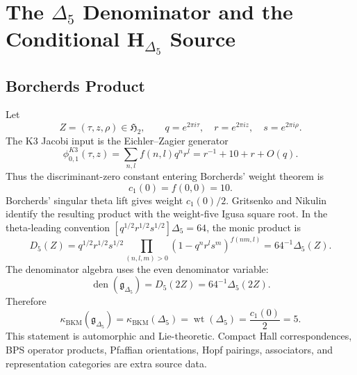 \section{The \texorpdfstring{$\Delta_5$}{Delta5} Denominator and the Conditional
\texorpdfstring{$\mathbf H_{\Delta_5}$}{HDelta5} Source}
\label{sec:delta5-denominator-conditional-hdelta5-source}

\providecommand{\BM}{\mathrm{BM}}
\providecommand{\CoHA}{\mathrm{CoHA}}
\providecommand{\Eone}{E_1}
\providecommand{\Etwo}{E_2}
\providecommand{\Rep}{\mathrm{Rep}}
\providecommand{\Prim}{\mathrm{Prim}}
\providecommand{\Hecke}{\mathrm{Hecke}}
\providecommand{\Hall}{\mathrm{Hall}}
\providecommand{\BKM}{\mathrm{BKM}}
\providecommand{\SVect}{\mathrm{SVect}}
\providecommand{\cH}{\mathcal H}
\providecommand{\cM}{\mathcal M}
\providecommand{\cP}{\mathcal P}
\providecommand{\cR}{\mathcal R}
\providecommand{\cZ}{\mathcal Z}
\providecommand{\fn}{\mathfrak n}
\providecommand{\kch}{\kappa_{\mathrm{ch}}}
\providecommand{\kcat}{\kappa_{\mathrm{cat}}}
\providecommand{\kBKM}{\kappa_{\mathrm{BKM}}}
\providecommand{\kfib}{\kappa_{\mathrm{fiber}}}
\providecommand{\kHeis}{\kappa_{\mathrm{ch}}^{\mathrm{Heis}}}
\providecommand{\gDelta}{\mathfrak g_{\Delta_5}}
\providecommand{\HDelta}{\mathbf H_{\Delta_5}}
\providecommand{\Dfive}{D_5}
\providecommand{\PhiTen}{\Phi_{10}}
\providecommand{\LII}{\Lambda^{2,1}_{\mathrm{II}}}
\providecommand{\WII}{W^{(2)}(\Lambda^{2,1}_{\mathrm{II}})}

\subsection{Borcherds Product}
\label{subsec:delta5-borcherds-product}

Let
\[
  Z=(\tau,z,\rho)\in\mathfrak H_2,\qquad
  q=e^{2\pi i\tau},\quad r=e^{2\pi iz},\quad s=e^{2\pi i\rho}.
\]
The K3 Jacobi input is the Eichler--Zagier generator
\[
  \phi_{0,1}^{K3}(\tau,z)=\sum_{n,l}f(n,l)q^nr^l
  =r^{-1}+10+r+O(q).
\]
Thus the discriminant-zero constant entering Borcherds' weight theorem
is
\[
  c_1(0)=f(0,0)=10.
\]
Borcherds' singular theta lift gives weight \(c_1(0)/2\).  Gritsenko
and Nikulin identify the resulting product with the weight-five Igusa
square root.  In the theta-leading convention
\([q^{1/2}r^{1/2}s^{1/2}]\Delta_5=64\), the monic product is
\[
  \Dfive(Z)
  =
  q^{1/2}r^{1/2}s^{1/2}
  \prod_{(n,l,m)>0}
  (1-q^nr^ls^m)^{f(nm,l)}
  =
  64^{-1}\Delta_5(Z).
\]
The denominator algebra uses the even denominator variable:
\[
  \operatorname{den}(\gDelta)
  =
  \Dfive(2Z)
  =
  64^{-1}\Delta_5(2Z).
\]
Therefore
\[
  \kBKM(\gDelta)
  =
  \kBKM(\Delta_5)
  =
  \operatorname{wt}(\Delta_5)
  =
  \frac{c_1(0)}2
  =
  5.
\]
This statement is automorphic and Lie-theoretic.  Compact Hall
correspondences, BPS operator products, Pfaffian orientations, Hopf
pairings, associators, and representation categories are extra source
data.

